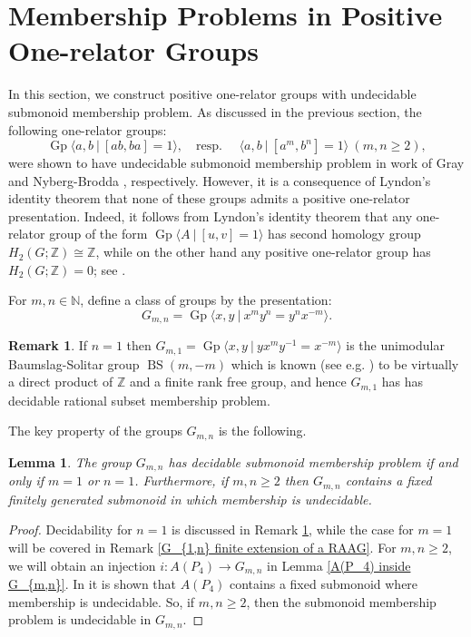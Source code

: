 \documentclass{amsart}
\makeatletter
\newcommand{\pres}[2]{\bigl\langle #1\:|\:#2 \bigr\rangle}
\newcommand{\Gpres}[2]{\operatorname{Gp}\bigl\langle #1\:|\:#2 \bigr\rangle}
\newcommand{\N}{\mathbb{N}}
\newcommand{\Z}{\mathbb{Z}}
\theoremstyle{plain}
\newtheorem{lemma}[theorem]{Lemma}
\theoremstyle{definition}
\newtheorem{remark}[theorem]{Remark}
\newcommand{\reqnomode}{\tagsleft@false\let\veqno\@@eqno}
\makeatother
\begin{document}
\section{Membership Problems in Positive One-relator Groups}\label{Sec:SMMP-in-positive-OR-groups}

In this section, we construct positive one-relator groups with undecidable submonoid membership problem. 
As discussed in the previous section, the following one-relator groups:
\[
\Gpres{a,b}{[ab, ba] = 1}, \quad \text{resp. } \quad \pres{a,b}{[a^m, b^n] = 1} \: (m, n \geq 2),
\]
were shown to have undecidable submonoid membership problem in work of Gray \cite{gray2020undecidability} and Nyberg-Brodda \cite{nyberg2022diophantine}, respectively. 
However, it is a consequence of Lyndon's identity theorem that none of these groups admits a positive one-relator presentation. Indeed, it follows from Lyndon's identity theorem that any one-relator group of the form $\Gpres{A}{[u, v] = 1}$ has second homology group $H_2(G; \mathbb{Z}) \cong \mathbb{Z}$, while on the other hand any positive one-relator group has $H_2(G; \mathbb{Z}) = 0$; see \cite[II.4, Example 3]{Brown1982}. 

For $m,n \in \N$, define a class of groups by the presentation:
\reqnomode
\begin{equation}\label{Eq:G_mn-definition}
G_{m,n} = \Gpres{x,y}{x^m y^n = y^n x^{-m}}.
\end{equation}

\begin{remark}\label{G_{m,1} is BS(m,-m)}
If $n=1$ then
$G_{m,1} = \Gpres{x, y}{y x^m y^{-1} = x^{-m}}$ is the unimodular Baumslag-Solitar group $\operatorname{BS}(m, -m)$ which 
is known (see e.g. \cite[paragraph preceding Prop.~3.9]{nyberg2022diophantine}) to be virtually a direct product of $\Z$ and a finite rank free group, and hence $G_{m,1}$ has has decidable rational subset membership problem.  
\end{remark}



The key property of the groups $G_{m,n}$ is the following. 






\begin{lemma}\label{lem_Gmn} 
The group
$G_{m,n}$
has decidable submonoid membership problem if and only if $m =1$ or $n=1$.
Furthermore, if $m, n \geq 2$ then $G_{m,n}$ contains a fixed finitely generated submonoid in which membership is undecidable.   
\end{lemma}
\begin{proof}
Decidability for $n = 1$ is discussed in Remark \ref{G_{m,1} is BS(m,-m)}, while the case for $m=1$ will be covered in Remark \ref{G_{1,n} finite extension of a RAAG}. For $m,n \geq 2$, we will obtain an injection $i \colon A(P_4) \longrightarrow G_{m,n}$ in Lemma \ref{A(P_4) inside G_{m,n}}. In \cite{Lohrey2008} it is shown that $A(P_4)$ contains a fixed submonoid where membership is undecidable. So, if $m,n \geq 2$, then the submonoid membership problem is undecidable in $G_{m,n}$.
\end{proof}
\end{document}
